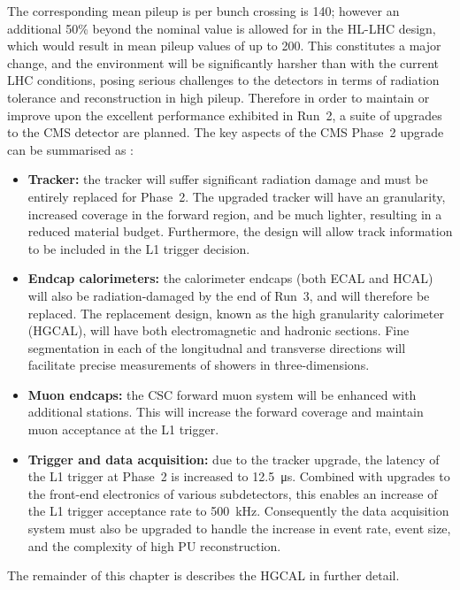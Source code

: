 The corresponding mean pileup is per bunch crossing is 140; however an additional 50\% beyond the nominal value is allowed for in the HL-LHC design, 
which would result in mean pileup values of up to 200.
This constitutes a major change, and the environment will be significantly harsher than with the current LHC conditions, 
posing serious challenges to the detectors in terms of radiation tolerance and reconstruction in high pileup.
Therefore in order to maintain or improve upon the excellent performance exhibited in Run~2, a suite of upgrades to the CMS detector are planned.
The key aspects of the CMS Phase~2 upgrade can be summarised as \cite{UpgradeTP}:
\begin{itemize}
  \item{\textbf{Tracker:}
  the tracker will suffer significant radiation damage and must be entirely replaced for Phase~2.
  The upgraded tracker will have an granularity, %
  increased coverage in the forward region, %
  and be much lighter, resulting in a reduced material budget.
  Furthermore, the design will allow track information to be included in the L1 trigger decision.}
  \item{\textbf{Endcap calorimeters:}
  the calorimeter endcaps (both ECAL and HCAL) will also be radiation-damaged by the end of Run~3, and will therefore be replaced.
  The replacement design, known as the high granularity calorimeter (HGCAL), will have both electromagnetic and hadronic sections.
  Fine segmentation in each of the longitudnal and transverse directions will facilitate precise measurements of showers in three-dimensions.}
  \item{\textbf{Muon endcaps:}
  the CSC forward muon system will be enhanced with additional stations.
  This will increase the forward coverage and maintain muon acceptance at the L1 trigger.}
  \item{\textbf{Trigger and data acquisition:}
  due to the tracker upgrade, the latency of the L1 trigger at Phase~2 is increased to \SI{12.5}{\micro\second}.
  Combined with upgrades to the front-end electronics of various subdetectors, %
  this enables an increase of the L1 trigger acceptance rate to \SI{500}{\kilo\hertz}.
  Consequently the data acquisition system must also be upgraded to handle the increase in event rate, event size, and the complexity of high PU reconstruction.}
\end{itemize}
The remainder of this chapter is describes the HGCAL in further detail.

